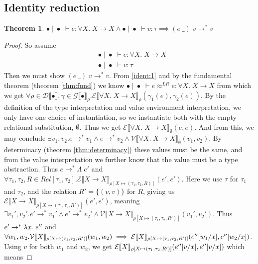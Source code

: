 \documentclass[twoside,11pt,openright]{report}
\newtheorem{theorem}{Theorem}
\theoremstyle{definition}
\newcommand{\var}{x}
\newcommand{\expr}{e}
\newcommand{\val}{v}
\newcommand{\valB}{w}
\newcommand{\Tvar}{X}
\newcommand{\Tlam}{\Lambda\;}
\newcommand{\Tapp}[1]{#1\;\_}
\newcommand{\subst}[3]{#1{\left[#3 \middle/ #2 \right]}}
\newcommand{\Tfunc}[2]{#1 \rightarrow #2}
\newcommand{\Tall}[2]{\forall #1.\; #2}
\newcommand{\typ}{\tau}
\newcommand{\emptenv}{\bullet}
\newcommand{\empvenv}{\bullet}
\newcommand{\jdg}[4]{#1 \; | \; #2 \; \vdash #3 : #4}
\newcommand{\jdgRel}[6]{#1 \; | \; #2 \; \vdash #3 \approx^{#4} #5 : #6}
\newcommand{\stepS}{\rightarrow^*}
\newcommand{\ValInp}[2]{\mathcal{V} \llbracket #1 \rrbracket_{#2}}
\newcommand{\ExpInp}[2]{\mathcal{E} \llbracket #1 \rrbracket_{#2}}
\newcommand{\VenvInp}[2]{\mathcal{G} \llbracket #1 \rrbracket_{#2}}
\newcommand{\TenvInp}[1]{\mathcal{D} \llbracket #1 \rrbracket}
\newcommand{\LogRel}[5]{\jdgRel{#1}{#2}{#3}{LR}{#4}{#5}}
\newcommand{\map}[2]{#1 \mapsto #2}
\begin{document}
\subsection{Identity reduction}
\begin{theorem}\label{thm:identity_reduction}
  $\jdg{\emptenv}{\empvenv}{\expr}{\Tall{\Tvar}{\Tfunc{\Tvar}{\Tvar}}} \land
  \jdg{\emptenv}{\empvenv}{\val}{\typ} \implies 
  (\Tapp{\expr}) \; \val \stepS \val$
\end{theorem}
\begin{proof}
  So assume
  \begin{align}
    &\jdg{\emptenv}{\empvenv}{\expr}{\Tall{\Tvar}{\Tfunc{\Tvar}{\Tvar}}}\label{ident:1}\\
    &\jdg{\emptenv}{\empvenv}{\val}{\typ}
  \end{align}
  Then we must show $(\Tapp{\expr}) \; \val \stepS \val$. From \ref*{ident:1} and by the fundamental theorem (theorem \ref{thm:fund}) we know $\LogRel{\emptenv}{\empvenv}{\expr}{\expr}{\Tall{\Tvar}{\Tfunc{\Tvar}{\Tvar}}}$ from which we get $\forall \rho \in \TenvInp{\emptenv}, \gamma \in \VenvInp{\empvenv}{\rho} . \ExpInp{\Tall{\Tvar}{\Tfunc{\Tvar}{\Tvar}}}{\rho}(\gamma_1(\expr), \gamma_2(\expr))$. By the definition of the type interpretation and value environment interpretation, we only have one choice of instantiation, so we instantiate both with the empty relational substitution, $\emptyset$. Thus we get $\ExpInp{\Tall{\Tvar}{\Tfunc{\Tvar}{\Tvar}}}{\emptyset}(\expr, \expr)$. And from this, we may conclude $\exists \val_1, \val_2 . \expr \stepS \val_1 \land \expr \stepS \val_2 \land \ValInp{\Tall{\Tvar}{\Tfunc{\Tvar}{\Tvar}}}{\emptyset}(\val_1, \val_2)$. By determinacy (theorem \ref{thm:determinacy}) these values must be the same, and from the value interpretation we further know that the value must be a type abstraction. Thus $\expr \stepS \Tlam \expr'$ and $\forall \typ_1, \typ_2, R \in Rel[\typ_1, \typ_2] . \ExpInp{\Tfunc{\Tvar}{\Tvar}}{\rho[\map{\Tvar}{(\typ_1, \typ_2, R)}]}(\expr', \expr')$. Here we use $\typ$ for $\typ_1$ and $\typ_2$, and the relation $R' = \{(\val, \val)\}$ for $R$, giving us $\ExpInp{\Tfunc{\Tvar}{\Tvar}}{\rho[\map{\Tvar}{(\typ_1, \typ_2, R')}]}(\expr', \expr')$, meaning $\exists \val_1', \val_2' . \expr' \stepS \val_1' \land \expr' \stepS \val_2' \land \ValInp{\Tfunc{\Tvar}{\Tvar}}{\rho[\map{\Tvar}{(\typ_1, \typ_2, R')}]}(\val_1', \val_2')$. Thus $\expr' \stepS \fun \var . \expr''$ and $\forall \valB_1, \valB_2 . \ValInp{\Tvar}{\rho[\map{\Tvar}{(\typ_1, \typ_2, R')}]}(\valB_{1}, \valB_{2}) \implies \ExpInp{\Tvar}{\rho[\map{\Tvar}{(\typ_1, \typ_2, R')}]}(\subst{\expr''}{\var}{\valB_1}, \subst{\expr''}{\var}{\valB_2})$. Using $\val$ for both $\valB_1$ and $\valB_2$, we get $\ExpInp{\Tvar}{\rho[\map{\Tvar}{(\typ_1, \typ_2, R')}]}(\subst{\expr''}{\var}{\val}, \subst{\expr''}{\var}{\val})$ which means 

\end{proof}
\end{document}
